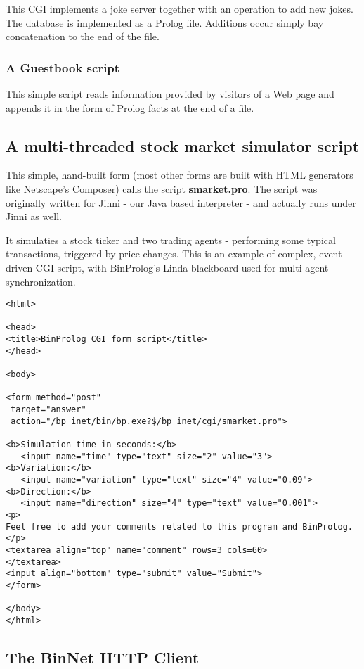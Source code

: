 \documentclass{article}
\begin{document}
This CGI implements a joke server together with an operation to add
new jokes. The database is implemented as a Prolog file. Additions
occur simply bay concatenation to the end of the file.

\subsubsection{A Guestbook script}

This simple script reads information provided by visitors of
a Web page and appends it in the form of Prolog facts at the end
of a file.

\subsection{A multi-threaded stock market simulator script}

This simple, hand-built form (most other forms are built with HTML generators
like Netscape's Composer) calls the script {\bf smarket.pro}. The script 
was originally written for Jinni - our Java based interpreter - and
actually runs under Jinni as well.

It simulaties a stock ticker and two trading agents - performing some 
typical transactions, triggered by price changes. This is an example
of complex, event driven CGI script, with BinProlog's Linda
blackboard used for multi-agent synchronization.

{\small \begin{verbatim}
<html>

<head>
<title>BinProlog CGI form script</title>
</head>

<body>

<form method="post" 
 target="answer" 
 action="/bp_inet/bin/bp.exe?$/bp_inet/cgi/smarket.pro"> 

<b>Simulation time in seconds:</b> 
   <input name="time" type="text" size="2" value="3">
<b>Variation:</b> 
   <input name="variation" type="text" size="4" value="0.09">
<b>Direction:</b> 
   <input name="direction" size="4" type="text" value="0.001">
<p>
Feel free to add your comments related to this program and BinProlog.
</p>
<textarea align="top" name="comment" rows=3 cols=60>
</textarea>
<input align="bottom" type="submit" value="Submit">
</form>

</body>
</html>
\end{verbatim}}

\subsection{The BinNet HTTP Client}
\end{document}
